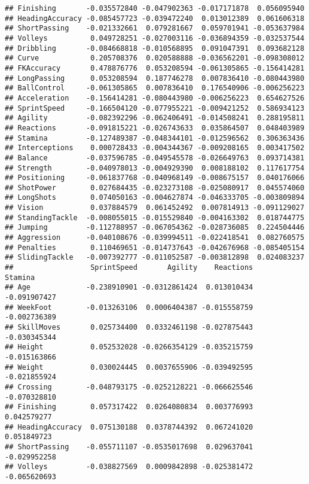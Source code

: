 \documentclass[
]{article}
\begin{document}
\begin{verbatim}
## Finishing       -0.035572840 -0.047902363 -0.017171878  0.056095940
## HeadingAccuracy -0.085457723 -0.039472240  0.013012389  0.061606318
## ShortPassing    -0.021332661  0.079281667  0.059701941 -0.053637984
## Volleys          0.049728251 -0.027003116 -0.036894359 -0.032537544
## Dribbling       -0.084668818 -0.010568895  0.091047391  0.093682128
## Curve            0.205708376  0.020588888 -0.036562201 -0.098308012
## FKAccuracy       0.478876776  0.053208594 -0.061305865 -0.156414281
## LongPassing      0.053208594  0.187746278  0.007836410 -0.080443980
## BallControl     -0.061305865  0.007836410  0.176540906 -0.006256223
## Acceleration    -0.156414281 -0.080443980 -0.006256223  0.654627526
## SprintSpeed     -0.166504120 -0.077955221 -0.009421252  0.586934123
## Agility         -0.082392296 -0.062406491 -0.014508241  0.288195811
## Reactions       -0.091815221 -0.026743633  0.035864507  0.048403989
## Stamina         -0.127489387 -0.048344101 -0.012596562  0.306363436
## Interceptions    0.000728433 -0.004344367 -0.009208165  0.003417502
## Balance         -0.037596785 -0.049545578 -0.026649763  0.093714381
## Strength        -0.040978013 -0.004929390  0.008188102  0.117617754
## Positioning     -0.061837768 -0.040968149 -0.008675157  0.040176066
## ShotPower        0.027684435 -0.023273108 -0.025080917  0.045574060
## LongShots        0.074050163 -0.004627874 -0.046333705 -0.003809894
## Vision           0.037884579  0.061452492  0.007814913 -0.091129027
## StandingTackle  -0.008055015 -0.015529840 -0.004163302  0.018744775
## Jumping         -0.112788957 -0.067054362 -0.028736085  0.224504446
## Aggression      -0.040108676 -0.039994511 -0.022418541  0.082760575
## Penalties        0.110469651 -0.014737643 -0.042676968 -0.085405154
## SlidingTackle   -0.007392777 -0.011052587 -0.003812898  0.024083237
##                  SprintSpeed       Agility    Reactions      Stamina
## Age             -0.238910901 -0.0312861424  0.013010434 -0.091907427
## WeekFoot        -0.013263106  0.0006404387 -0.015558759 -0.002736389
## SkillMoves       0.025734400  0.0332461198 -0.027875443 -0.030345344
## Height           0.052532028 -0.0266354129 -0.035215759 -0.015163866
## Weight           0.030024445  0.0037655906 -0.039492595 -0.021855924
## Crossing        -0.048793175 -0.0252128221 -0.066625546 -0.070328810
## Finishing        0.057317422  0.0264080834  0.003776993  0.042579277
## HeadingAccuracy  0.075130188  0.0378744392  0.067241020  0.051849723
## ShortPassing    -0.055711107 -0.0535017698  0.029637041 -0.029952258
## Volleys         -0.038827569  0.0009842898 -0.025381472 -0.065620693

\end{verbatim}
\end{document}
